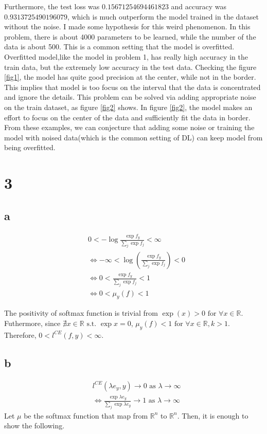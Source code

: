\documentclass[10pt]{article}
\begin{document}
Furthermore, the test loss was $0.15671254694461823$ and accuracy was $0.9313725490196079$, which is much outperform the model trained in the dataset without the noise. 
I made some hypothesis for this weird phenomenon. In this problem, there is about 4000 parameters to be learned, while the number of the data is about 500.
This is a common setting that the model is overfitted. Overfitted model,like the model in problem 1, has really high accuracy in the train data, but the extremely low accuracy in the test data. 
Checking the figure \ref{fig1}, the model has quite good precision at the center, while not in the border. This implies that model is too focus on the interval that the data is concentrated and ignore the details. 
This problem can be solved via adding appropriate noise on the train dataset, as figure \ref{fig2} shows. In figure \ref{fig2}, the model makes an effort to focus on the center of the data and sufficiently fit the data in border. 
From these examples, we can conjecture that adding some noise or training the model with noised data(which is the common setting of DL) can keep model from being overfitted. 






\section*{3}
\subsection*{a}
\begin{align*}
    &0<-\log{\frac{\exp{f_y}}{\sum_j \exp{f_j}}}<\infty\\
    & \iff -\infty < \log(\frac{\exp{f_y}}{\sum_j \exp{f_j}})<0 \\
    & \iff 0 < \frac{\exp{f_y}}{\sum_j \exp{f_j}} <1 \\
    & \iff 0 < \mu_y(f) < 1
\end{align*}

The positivity of softmax function is trivial from $\exp(x)>0 \text{ for } \forall x \in \mathbb{R}$. 
Futhermore, since $\nexists x\in \mathbb{R} \text{ s.t. } \exp{x} =  0$, $\mu_y(f) < 1 \text{ for } \forall x \in \mathbb{R}, k>1$.
Therefore, $0<l^{CE}(f,y)<\infty$.
\subsection*{b}

\begin{align*}
    &l^{CE}(\lambda e_y,y) \rightarrow 0 \text{ as } \lambda \rightarrow \infty \\
    &\iff \frac{\exp{\lambda e_y}}{\sum_j \exp{\lambda e_y}} \rightarrow 1 \text{ as } \lambda \rightarrow \infty
\end{align*}
Let $\mu$ be the softmax function that map from $\mathbb{R}^n$ to $\mathbb{R}^n$. Then, it is enough to show the following.
\end{document}
